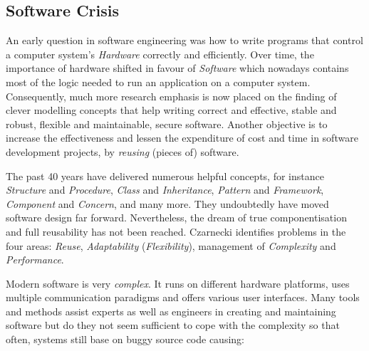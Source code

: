 %
%
%
%
%
%
%

\subsection{Software Crisis}
\label{software_crisis_heading}

An early question in software engineering was how to write programs that control
a computer system's \emph{Hardware} correctly and efficiently. Over time, the
importance of hardware shifted in favour of \emph{Software} which nowadays
contains most of the logic needed to run an application on a computer system.
Consequently, much more research emphasis is now placed on the finding of clever
modelling concepts that help writing correct and effective, stable and robust,
flexible and maintainable, secure software. Another objective is to increase the
effectiveness and lessen the expenditure of cost and time in software development
projects, by \emph{reusing} (pieces of) software.

The past 40 years have delivered numerous helpful concepts, for instance
\emph{Structure} and \emph{Procedure}, \emph{Class} and \emph{Inheritance},
\emph{Pattern} and \emph{Framework}, \emph{Component} and \emph{Concern}, and
many more. They undoubtedly have moved software design far forward. Nevertheless,
the dream of true componentisation and full reusability has not been reached.
Czarnecki \cite{czarnecki} identifies problems in the four areas: \emph{Reuse},
\emph{Adaptability} (\emph{Flexibility}), management of \emph{Complexity} and
\emph{Performance}.

Modern software is very \emph{complex}. It runs on different hardware platforms,
uses multiple communication paradigms and offers various user interfaces. Many
tools and methods assist experts as well as engineers in creating and maintaining
software but do they not seem sufficient to cope with the complexity so that
often, systems still base on buggy source code causing:

